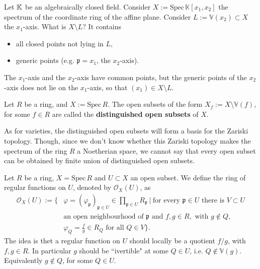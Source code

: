 \begin{ex}
	Let $\mathbb{K}$ be an algebraically closed field.
	Consider $X := \mathrm{Spec}\, \mathbb{K}\left[x_1, x_2 \right]$
	the spectrum of the coordinate ring of the affine plane.
	Consider $L := \mathbb{V}\left( x_2 \right) \subset X$ the $x_1$-axis.
	What is $X \setminus L$?
	It contains
	\begin{itemize}
		\item all closed points not lying in $L$,
		\item generic points (e.g. $\mathfrak{p} = x_1$, the $x_2$-axis).
	\end{itemize}
	The $x_1$-axis and the $x_2$-axis have common points, but
	the generic points of the $x_2$-axis does not lie on the $x_1$-axis,
	so that $(x_1) \in X \setminus L$.
\end{ex} 

\begin{defn}
	Let $R$ be a ring, and $X := \mathrm{Spec}\, R$.
	The open subsets of the form $X_f := X \setminus \mathbb{V}\left( f \right)$, for some $f \in R$
	are called the \textbf{distinguished open subsets} of $X$.
\end{defn}

\begin{rem}[]
	As for varieties, the distinguished open subsets will form a basis for the Zariski topology.
	Though, since we don't know whether this Zariski topology makes the spectrum of the ring $R$
	a Noetherian space, we cannot say that every open subset can be obtained by
	finite union of distinguished open subsets.
\end{rem}

\begin{defn}
	Let $R$ be a ring, $X = \mathrm{Spec}\, R$ and $U \subset X$ an open subset.
	We define the ring of regular functions on $U$, denoted by $\mathcal{O}_{X} \left( U \right)$,
	as
	\begin{align}
		\mathcal{O}_{X} \left( U \right) := \bigg\{ &\varphi = \left( \varphi_{\mathfrak{p}} \right)_{\mathfrak{p} \in U}
		\in \prod_{\mathfrak{p} \in U} R_{\mathfrak{p}} \ \bigg|\ \text{for every }
		\mathfrak{p} \in U \text{ there is } V \subset U\\
		&\text{an open neighbourhood of } \mathfrak{p} \text{ and } f,g \in R, 
		\text{ with } g \notin Q,\\
		&\varphi_Q = \frac{f}{g} \in R_Q \text{ for all } Q \in V \bigg\}
	.\end{align} 
	The idea is thet a regular function on $U$ should locally be a quotient $f/g$,
	with $f,g \in R$. In particular $g$ should be ``ivertible" at some $Q \in U$, i.e.
	$Q \notin \mathbb{V}\left( g \right)$.
	Equivalently $g \notin Q$, for some $Q \in U$.
\end{defn}

